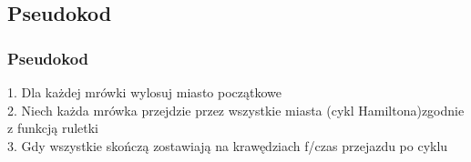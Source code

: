 \documentclass{beamer}
\begin{document}
\subsection{Pseudokod}

\begin{frame}
\frametitle{Pseudokod}
1. Dla każdej mrówki wylosuj miasto początkowe \\
2. Niech każda mrówka przejdzie przez wszystkie miasta (cykl Hamiltona)zgodnie z funkcją ruletki  \\
3. Gdy wszystkie skończą zostawiają na krawędziach f/czas przejazdu po cyklu \\

 


\end{frame}
\end{document}
